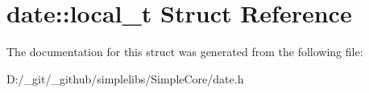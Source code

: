 \hypertarget{structdate_1_1local__t}{}\section{date\+::local\+\_\+t Struct Reference}
\label{structdate_1_1local__t}


The documentation for this struct was generated from the following file\+:\begin{DoxyCompactItemize}
\item 
D\+:/\+\_\+git/\+\_\+github/simplelibs/\+Simple\+Core/date.\+h\end{DoxyCompactItemize}
